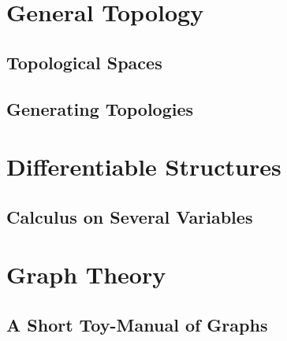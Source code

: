 



\part{General Topology}

\chapter{Topological Spaces}








\chapter{Generating Topologies}






\part{Differentiable Structures}

\chapter{Calculus on Several Variables}





\part{Graph Theory}

\chapter{A Short Toy-Manual of Graphs}








